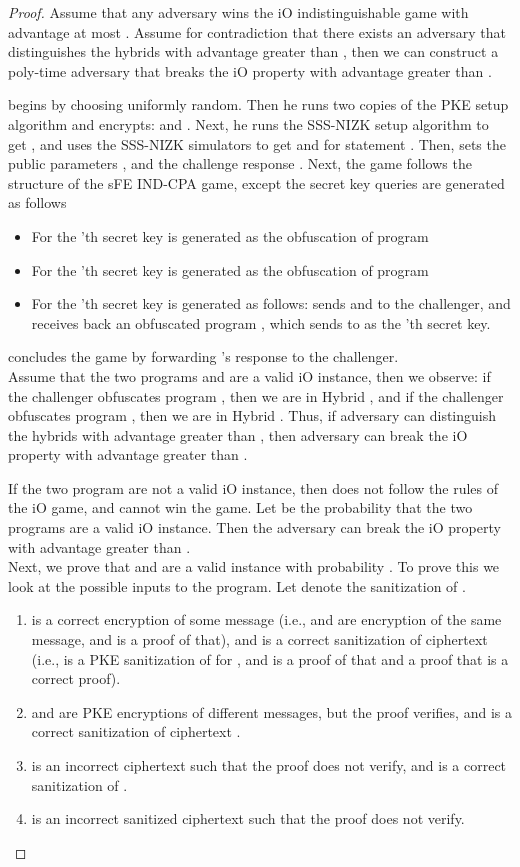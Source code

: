 \documentclass{llncs}
\begin{document}
\begin{proof}
Assume that any adversary wins the iO indistinguishable game with advantage at most .
Assume for contradiction that there exists an adversary  that distinguishes the hybrids with advantage greater than , then we can construct a poly-time adversary  that breaks the iO property with advantage greater than . 

 begins by choosing  uniformly random. Then he runs two copies of the PKE setup algorithm and encrypts:  and . Next, he runs the SSS-NIZK setup algorithm to get , and uses the SSS-NIZK simulators to get  and  for statement . Then,  sets the public parameters , and the challenge response . 
Next, the game follows the structure of the sFE IND-CPA game, except the secret key queries are generated as follows
\begin{itemize}
\item For  the 'th secret key is generated as the obfuscation of program 
\item For  the 'th secret key is generated as the obfuscation of program 
\item For  the 'th secret key is generated as follows:  sends  and  to the challenger, and receives back an obfuscated program , which  sends to  as the 'th secret key.
\end{itemize}
 concludes the game by forwarding 's response  to the challenger.  \\

Assume that the two programs  and  are a valid iO instance, then we observe: if the challenger obfuscates program , then we are in Hybrid , and if the challenger obfuscates program , then we are in Hybrid . Thus, if adversary  can distinguish the hybrids with advantage greater than , then adversary  can break the iO property with advantage greater than . 

If the two program are not a valid iO instance, then  does not follow the rules of the iO game, and cannot win the game. Let  be the probability that the two programs are a valid iO instance. Then the adversary  can break the iO property with advantage greater than . \\

Next, we prove that  and  are a valid instance with probability .
To prove this we look at the possible inputs to the program. Let  denote the sanitization of .
\begin{enumerate}
\item  is a correct encryption of some message (i.e.,  and  are encryption of the same message, and  is a proof of that), and  is a correct sanitization of ciphertext  (i.e.,  is a PKE sanitization of  for , and  is a proof of that and a proof that  is a correct proof).
\item  and  are PKE encryptions of different messages, but the proof  verifies, and  is a correct sanitization of ciphertext .
\item  is an incorrect ciphertext such that the proof  does not verify, and  is a correct sanitization of .
\item  is an incorrect sanitized ciphertext such that the proof  does not verify.
\end{enumerate}


\end{proof}
\end{document}
